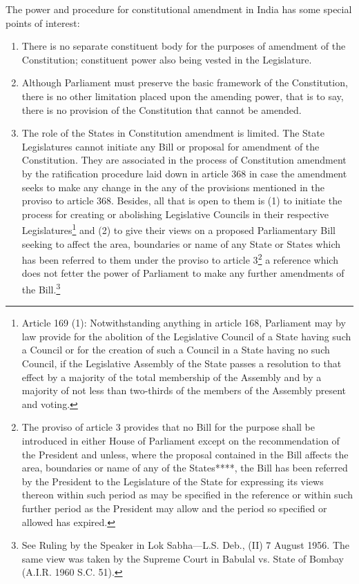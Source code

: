 \begin{multicols}{2}
\noi
The power and procedure for constitutional amendment in India has some special points of
interest:

\begin{enumerate}
\item There is no separate constituent body for the purposes of amendment of the Constitution;
constituent power also being vested in the Legislature.

\item Although Parliament must preserve the basic framework of the Constitution, there is no
other limitation placed upon the amending power, that is to say, there is no provision of the
Constitution that cannot be amended.

\item The role of the States in Constitution amendment is limited. The State Legislatures cannot
initiate any Bill or proposal for amendment of the Constitution. They are associated in the
process of Constitution amendment by the ratification procedure laid down in article 368 in
case the amendment seeks to make any change in the any of the provisions mentioned in the
proviso to article 368. Besides, all that is open to them is (1) to initiate the process for creating
or abolishing Legislative Councils in their respective Legislatures\footnote{Article 169 (1): Notwithstanding anything in article 168, Parliament may by law provide for the abolition of the Legislative Council of a State having such a Council or for the creation of such a Council in a State having no such Council, if the Legislative Assembly of the State passes a resolution to that effect by a majority of the total membership of the Assembly and by a majority of not less than two-thirds of the members of the Assembly present and voting.} and (2) to give their views
on a proposed Parliamentary Bill seeking to affect the area, boundaries or name of any State
or States which has been referred to them under the proviso to article 3\footnote{The proviso of article 3 provides that no Bill for the purpose shall be introduced in either House of Parliament
except on the recommendation of the President and unless, where the proposal contained in the Bill affects the
area, boundaries or name of any of the States****, the Bill has been referred by the President to the Legislature
of the State for expressing its views thereon within such period as may be specified in the reference or within such
further period as the President may allow and the period so specified or allowed has expired.} a reference which
does not fetter the power of Parliament to make any further amendments of the Bill.\footnote{See Ruling by the Speaker in Lok Sabha—L.S. Deb., (II) 7 August 1956. The same view was taken by the Supreme Court in Babulal vs. State of Bombay (A.I.R. 1960 S.C. 51).}
\end{enumerate}


\end{multicols}
